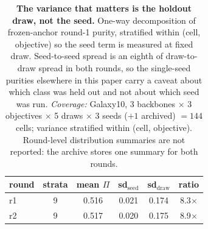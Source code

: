 \begin{table}[t]
\centering
\small
\begin{tabular}{lccccc}
\toprule
round & strata & mean $\Pi$ & sd$_{\text{seed}}$ & sd$_{\text{draw}}$ & ratio \\
\midrule
r1 & 9 & 0.516 & 0.021 & 0.174 & 8.3$\times$ \\
r2 & 9 & 0.517 & 0.020 & 0.175 & 8.9$\times$ \\
\bottomrule
\end{tabular}
\caption{\textbf{The variance that matters is the holdout draw, not the seed.} One-way decomposition of frozen-anchor round-1 purity, stratified within (cell, objective) so the seed term is measured at fixed draw. Seed-to-seed spread is an eighth of draw-to-draw spread in both rounds, so the single-seed purities elsewhere in this paper carry a caveat about which class was held out and not about which seed was run. \emph{Coverage:} Galaxy10, 3 backbones $\times$ 3 objectives $\times$ 5 draws $\times$ 3 seeds ($+1$ archived) $= 144$ cells; variance stratified within (cell, objective). Round-level distribution summaries are not reported: the archive stores one summary for both rounds.}
\label{tab:hardening}
\end{table}
